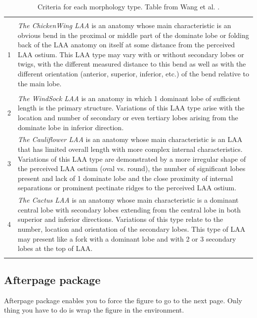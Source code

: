 \begin{table}[t]
  \centering
  \caption{Criteria for each morphology type. Table from Wang et al. \cite{wang2010_LeftAtrialAppendage}.}
  \label{tab:bg_laa_morphology}
  \begin{tabular}{IL}
    \hline\noalign{\smallskip}
    \\
    \noalign{\smallskip}\hline\noalign{\smallskip}
    1 & \emph{The ChickenWing LAA} {\footnotesize is an anatomy whose main characteristic is an obvious bend in the proximal or middle part of the dominate lobe or folding back of the LAA anatomy on itself at some distance from the perceived LAA ostium. This LAA type may vary with or without secondary lobes or twigs, with the different measured distance to this bend as well as with the different orientation (anterior, superior, inferior, etc.) of the bend relative to the main lobe.} \\
    \noalign{\smallskip}\hline\noalign{\smallskip}
    \\
    \noalign{\smallskip}\hline\noalign{\smallskip}
    2 & \emph{The WindSock LAA}  {\footnotesize  is an anatomy in which 1 dominant lobe of sufficient length is the primary structure. Variations of this LAA type arise with the location and number of secondary or even tertiary lobes arising from the dominate lobe in inferior direction.} \\
    3 & \emph{The Cauliflower LAA} {\footnotesize  is an anatomy whose main characteristic is an LAA that has limited overall length with more complex internal characteristics. Variations of this LAA type are demonstrated by a more irregular shape of the perceived LAA ostium (oval vs. round), the number of significant lobes present and lack of 1 dominate lobe and the close proximity of internal separations or prominent pectinate ridges to the perceived LAA ostium.} \\
    4 & \emph{The Cactus LAA} {\footnotesize  is an anatomy whose main characteristic is a dominant central lobe with secondary lobes extending from the central lobe in both superior and inferior directions. Variations of this type relate to the number, location and orientation of the secondary lobes. This type of LAA may present like a fork with a dominant lobe and with 2 or 3 secondary lobes at the top of LAA. } \\
    \noalign{\smallskip}\hline\noalign{\smallskip}
  \end{tabular}
\end{table}


\subsection{Afterpage package}%
\label{sec:afterpage_package}
Afterpage package enables you to force the figure to go to the next page. Only
thing you have to do is wrap the figure in the  
environment.
